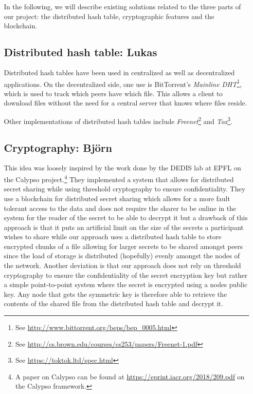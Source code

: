 \documentclass[12pt,a4paper,draft]{article}
\begin{document}
In the following, we will describe existing solutions related to the three parts of our project: the distributed hash table, cryptographic features and the blockchain.

\subsection{Distributed hash table: Lukas}

Distributed hash tables have been used in centralized as well as decentralized applications.
On the decentralized side, one use is BitTorrent's \emph{Mainline DHT}\footnote{See \url{http://www.bittorrent.org/beps/bep_0005.html}}, which is used to track which peers have which file.
This allows a client to download files without the need for a central server that knows where files reside.

Other implementations of distributed hash tables include \emph{Freenet}\footnote{See \url{http://cs.brown.edu/courses/cs253/papers/Freenet-1.pdf}} and \emph{Tox}\footnote{See \url{https://toktok.ltd/spec.html}}.

\subsection{Cryptography: Björn}

This idea was loosely inspired by the work done by the DEDIS lab at EPFL on the Calypso project.\footnote{A paper on Calypso can be found at \url{https://eprint.iacr.org/2018/209.pdf} on the Calypso framework.} They implemented a system that allows for distributed secret sharing while using threshold cryptography to ensure confidentiality. They use a blockchain for distributed secret sharing which allows for a more fault tolerant access to the data and does not require the sharer to be online in the system for the reader of the secret to be able to decrypt it but a drawback of this approach is that it puts an artificial limit on the size of the secrets a participant wishes to share while our approach uses a distributed hash table to store encrypted chunks of a file allowing for larger secrets to be shared amongst peers since the load of storage is distributed (hopefully) evenly amongst the nodes of the network. Another deviation is that our approach does not rely on threshold cryptography to ensure the confidentiality of the secret encryption key but rather a simple point-to-point system where the secret is encrypted using a nodes public key. Any node that gets the symmetric key is therefore able to retrieve the contents of the shared file from the distributed hash table and decrypt it.
\end{document}
